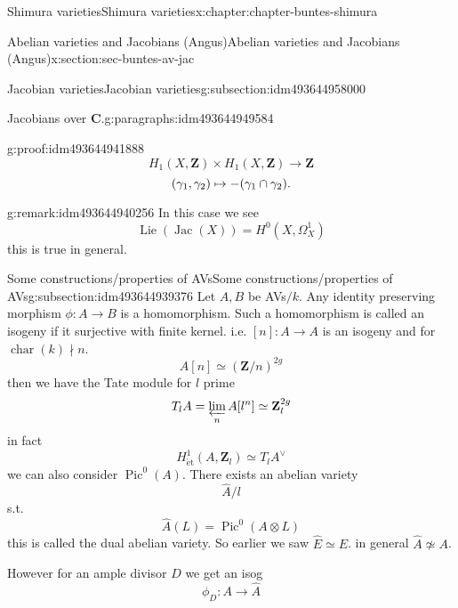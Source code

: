 \documentclass[oneside,10pt,]{book}
\newcommand{\qedhere}{\relax}
\numberwithin{equation}{section}
\DeclareMathOperator{\Lie}{Lie}
\newcommand{\lb}{[}
\newcommand{\rb}{]}
\newcommand{\ZZ}{\mathbf{Z}}
\newcommand{\CC}{\mathbf{C}}
\newcommand{\et}{\mathrm{\acute{e}t}}
\DeclareMathOperator{\Pic}{Pic}
\DeclareMathOperator{\Jac}{Jac}
\DeclareMathOperator{\characteristic}{char}
\begin{document}
\begin{chapterptx}{Shimura varieties}{}{Shimura varieties}{}{}{x:chapter:chapter-buntes-shimura}
\begin{sectionptx}{Abelian varieties and Jacobians (Angus)}{}{Abelian varieties and Jacobians (Angus)}{}{}{x:section:sec-buntes-av-jac}
\begin{subsectionptx}{Jacobian varieties}{}{Jacobian varieties}{}{}{g:subsection:idm493644958000}
\begin{paragraphs}{Jacobians over \(\CC\).}{g:paragraphs:idm493644949584}
\begin{proofptx}{}{g:proof:idm493644941888}
\begin{equation*}
H_1(X, \ZZ) \times H_1(X, \ZZ) \to \ZZ
\end{equation*}
%
\begin{equation*}
(\gamma_1, \gamma_2) \mapsto -(\gamma_1\cap \gamma_2)\text{.}\qedhere
\end{equation*}
%
\end{proofptx}
\begin{remark}{}{g:remark:idm493644940256}%
In this case we see%
\begin{equation*}
\Lie(\Jac(X)) = H^0(X, \Omega_X^1)
\end{equation*}
this is true in general.%
\end{remark}
\end{paragraphs}%
\end{subsectionptx}
%
%
\typeout{************************************************}
\typeout{************************************************}
%
\begin{subsectionptx}{Some constructions\slash{}properties of AVs}{}{Some constructions\slash{}properties of AVs}{}{}{g:subsection:idm493644939376}
Let \(A,B\) be AVs\(/k\). Any identity preserving morphism \(\phi \colon A \to B\) is a homomorphism. Such a homomorphism is called an isogeny if it surjective with finite kernel. i.e. \(\lb n \rb \colon A \to A\) is an isogeny and for \(\characteristic(k) \nmid n\).%
\begin{equation*}
A[n] \simeq (\ZZ/n)^{2g}
\end{equation*}
then we have the Tate module for \(l\) prime%
\begin{equation*}
T_lA = \varprojlim_n A[l^n] \simeq \ZZ_l^{2g}
\end{equation*}
in fact%
\begin{equation*}
H^1_{\et} (A, \ZZ_l) \simeq T_lA ^\vee
\end{equation*}
we can also consider \(\Pic^0(A)\). There exists an abelian variety%
\begin{equation*}
\hat A/l
\end{equation*}
s.t.%
\begin{equation*}
\hat A (L) = \Pic^0(A \otimes L)
\end{equation*}
this is called the dual abelian variety. So earlier we saw \(\hat E \simeq E\). in general \(\hat A \not \simeq  A\).%
\par
However for an ample divisor \(D\) we get an isog%
\begin{equation*}
\phi_D \colon A \to \hat A
\end{equation*}

\end{subsectionptx}
\end{sectionptx}
\end{chapterptx}
\end{document}
